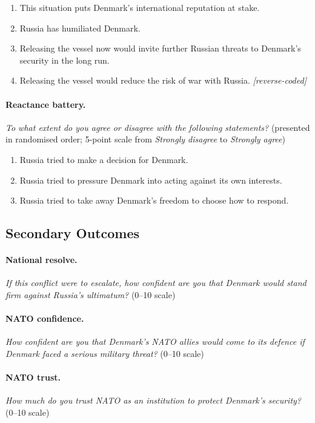 \begin{enumerate}
    \item This situation puts Denmark's international reputation at stake.
    \item Russia has humiliated Denmark.
    \item Releasing the vessel now would invite further Russian threats to Denmark's security in the long run.
    \item Releasing the vessel would reduce the risk of war with Russia. \hfill \textit{[reverse-coded]}
\end{enumerate}

\paragraph{Reactance battery.}
\textit{To what extent do you agree or disagree with the following statements?} (presented in randomised order; 5-point scale from \textit{Strongly disagree} to \textit{Strongly agree})

\begin{enumerate}
    \item Russia tried to make a decision for Denmark.
    \item Russia tried to pressure Denmark into acting against its own interests.
    \item Russia tried to take away Denmark's freedom to choose how to respond.
\end{enumerate}

\subsection{Secondary Outcomes}

\paragraph{National resolve.}
\textit{If this conflict were to escalate, how confident are you that Denmark would stand firm against Russia's ultimatum?} (0--10 scale)

\paragraph{NATO confidence.}
\textit{How confident are you that Denmark's NATO allies would come to its defence if Denmark faced a serious military threat?} (0--10 scale)

\paragraph{NATO trust.}
\textit{How much do you trust NATO as an institution to protect Denmark's security?} (0--10 scale)

